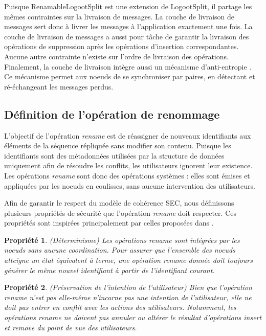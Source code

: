 \documentclass[12pt]{thesul}
\newtheorem{property}{Propriété}
\begin{document}
Puisque RenamableLogootSplit est une extension de LogootSplit, il partage les mêmes contraintes sur la livraison de messages.
La couche de livraison de messages sert donc à livrer les messages à l'application exactement une fois.
La couche de livraison de messages a aussi pour tâche de garantir la livraison des opérations de suppression après les opérations d'insertion correspondantes.
Aucune autre contrainte n'existe sur l'ordre de livraison des opérations.
Finalement, la couche de livraison intègre aussi un mécanisme d'anti-entropie \cite{1983-anti-entropy-vv}.
Ce mécanisme permet aux noeuds de se synchroniser par paires, en détectant et ré-échangeant les messages perdus.

\subsection{Définition de l'opération de renommage}

\label{sec:def-rename-op}

L'objectif de l'opération \emph{rename} est de réassigner de nouveaux identifiants aux éléments de la séquence répliquée sans modifier son contenu.
Puisque les identifiants sont des métadonnées utilisées par la structure de données uniquement afin de résoudre les conflits, les utilisateurs ignorent leur existence.
Les opérations \emph{rename} sont donc des opérations systèmes : elles sont émises et appliquées par les noeuds en coulisses, sans aucune intervention des utilisateurs.

Afin de garantir le respect du modèle de cohérence \ac{SEC}, nous définissons plusieurs propriétés de sécurité que l'opération \emph{rename} doit respecter.
Ces propriétés sont inspirées principalement par celles proposées dans \cite{zawirski:hal-01248197}.

\begin{property}(Déterminisme)
  Les opérations \emph{rename} sont intégrées par les noeuds sans aucune coordination.
  Pour assurer que l'ensemble des noeuds atteigne un état équivalent à terme, une opération \emph{rename} donnée doit toujours générer le même nouvel identifiant à partir de l'identifiant courant.
\end{property}

\begin{property}(Préservation de l'intention de l'utilisateur)
  Bien que l'opération \emph{rename} n'est pas elle-même n'incarne pas une intention de l'utilisateur, elle ne doit pas entrer en conflit avec les actions des utilisateurs.
  Notamment, les opérations \emph{rename} ne doivent pas annuler ou altérer le résultat d'opérations \emph{insert} et \emph{remove} du point de vue des utilisateurs.
\end{property}
\end{document}
